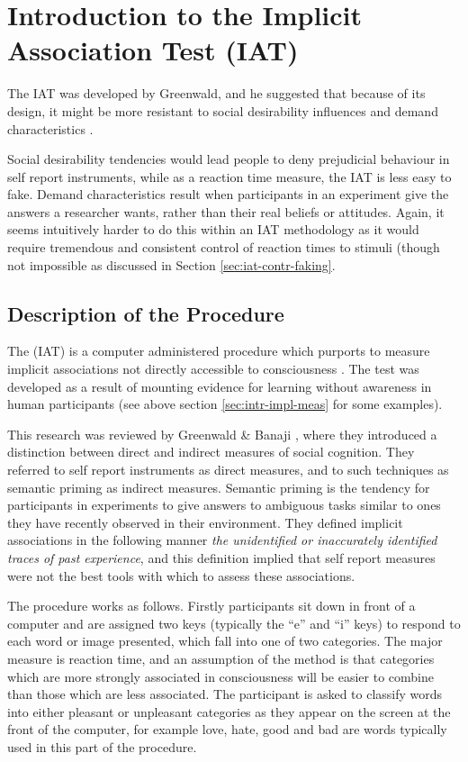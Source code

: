 \section{Introduction to the Implicit Association Test (IAT)}
\label{sec:intr-impl-assoc}

The IAT was developed by Greenwald, and he suggested that because of its design, it might be more resistant to social desirability influences and demand characteristics \cite{Greenwald1998}. 

Social desirability tendencies would lead people to deny prejudicial behaviour in self report instruments, while as a reaction time measure, the IAT is less easy to fake. Demand characteristics result when participants in an experiment give the answers a researcher wants, rather than their real beliefs or attitudes. Again, it seems intuitively harder to do this within an IAT methodology as it would require tremendous and consistent control of reaction times to stimuli (though not impossible as discussed in Section \ref{sec:iat-contr-faking}. 

\subsection{Description of the Procedure}
\label{sec:descr-proc}

The (IAT) is a computer administered procedure which purports to measure implicit associations not directly accessible to consciousness \cite{Greenwald1998}. The test was developed as a result of mounting evidence for learning without awareness in human participants (see above section \ref{sec:intr-impl-meas} for some examples). 

This research was reviewed by Greenwald \& Banaji \cite{Greenwald1995a}, where they introduced a distinction between direct and indirect measures of social cognition. They referred to self report instruments as direct measures, and to such techniques as semantic priming as indirect measures. Semantic priming is the tendency for participants in experiments to give answers to ambiguous tasks similar to ones they have recently observed in their environment.  They defined implicit associations in the following manner \textit{the unidentified or inaccurately identified traces of past experience}, and this definition implied that self report measures were not the best tools with which to assess these associations. 

The procedure works as follows. Firstly participants sit down in front of a computer and are assigned two keys (typically the ``e'' and ``i'' keys) to respond to each word or image presented, which fall into one of two categories. The major measure is reaction time, and an assumption of the method is that categories which are more strongly associated in consciousness will be easier to combine than those which are less associated.  The participant is asked to classify words into either pleasant or unpleasant categories as they appear on the screen at the front of the computer, for example love, hate, good  and bad are words typically used in this part of the procedure. 

